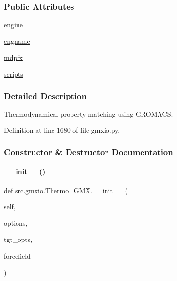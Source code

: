 \subsubsection*{Public Attributes}
\begin{DoxyCompactItemize}
\item 
\hyperlink{classsrc_1_1gmxio_1_1Thermo__GMX_a5b12f143acdda7984617d9cb504768be}{engine\+\_\+}
\item 
\hyperlink{classsrc_1_1gmxio_1_1Thermo__GMX_af96e039d1e88ed05c48f8f8bed80045e}{engname}
\item 
\hyperlink{classsrc_1_1gmxio_1_1Thermo__GMX_aceb73e3767c11d6fae3aa6412dd63c59}{mdpfx}
\item 
\hyperlink{classsrc_1_1gmxio_1_1Thermo__GMX_ad5ee6853eb28b23b3110f6ed984bf779}{scripts}
\end{DoxyCompactItemize}


\subsubsection{Detailed Description}
Thermodynamical property matching using G\+R\+O\+M\+A\+CS. 



Definition at line 1680 of file gmxio.\+py.



\subsubsection{Constructor \& Destructor Documentation}
\mbox{\label{classsrc_1_1gmxio_1_1Thermo__GMX_a28327f0cc649a64079b3290d85b1bc09}} 
\paragraph{\texorpdfstring{\+\_\+\+\_\+init\+\_\+\+\_\+()}{\_\_init\_\_()}}
{\footnotesize\ttfamily def src.\+gmxio.\+Thermo\+\_\+\+G\+M\+X.\+\_\+\+\_\+init\+\_\+\+\_\+ (\begin{DoxyParamCaption}\item[{}]{self,  }\item[{}]{options,  }\item[{}]{tgt\+\_\+opts,  }\item[{}]{forcefield }\end{DoxyParamCaption})}



